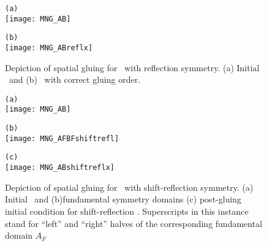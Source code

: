 \begin{figure}
\begin{minipage}[height=.1\textheight]{.45\textwidth}
\centering
\small{\texttt{(a)}} \\
\texttt{[image: MNG\_AB]}
\end{minipage}
\begin{minipage}[height=.1\textheight]{.45\textwidth}
\centering
\small{\texttt{(b)}} \\
\texttt{[image: MNG\_ABreflx]}
\end{minipage}
\caption{ \label{fig:MNGreflxglue}
Depiction of spatial gluing for \twots\ with reflection symmetry. (a) Initial
\twots\ and (b) \twots\ with correct gluing order.
}
\end{figure}


\begin{figure}
\begin{minipage}[height=.1\textheight]{.45\textwidth}
\centering
\small{\texttt{(a)}} \\
\texttt{[image: MNG\_AB]}
\end{minipage}
\begin{minipage}[height=.1\textheight]{.45\textwidth}
\centering
\small{\texttt{(b)}} \\
\texttt{[image: MNG\_AFBFshiftrefl]}
\end{minipage}
\centering
\begin{minipage}[height=.1\textheight]{.6\textwidth}
\centering
\small{\texttt{(c)}} \\
\texttt{[image: MNG\_ABshiftreflx]}
\end{minipage}
\caption{ \label{fig:MNGshiftreflxglue}
Depiction of spatial gluing for \twots\ with shift-reflection symmetry. (a) Initial
\twots\ and (b)fundamental symmetry domains (c) post-gluing initial condition for
shift-reflection \twot. Superscripts in this instance stand for ``left'' and
``right'' halves of the corresponding fundamental domain $A_F$
}
\end{figure}

